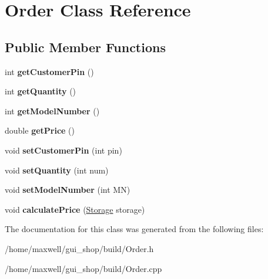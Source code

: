 \hypertarget{classOrder}{}\section{Order Class Reference}
\label{classOrder}
\subsection*{Public Member Functions}
\begin{DoxyCompactItemize}
\item 
int {\bfseries get\+Customer\+Pin} ()\hypertarget{classOrder_a580409072a98cb93cb79962d8b97ebdd}{}\label{classOrder_a580409072a98cb93cb79962d8b97ebdd}

\item 
int {\bfseries get\+Quantity} ()\hypertarget{classOrder_a458491516d3ef8338525f9be5f5f7dc8}{}\label{classOrder_a458491516d3ef8338525f9be5f5f7dc8}

\item 
int {\bfseries get\+Model\+Number} ()\hypertarget{classOrder_a8379026e646f8e9dc8efe19325bb3ee3}{}\label{classOrder_a8379026e646f8e9dc8efe19325bb3ee3}

\item 
double {\bfseries get\+Price} ()\hypertarget{classOrder_a587e5e46cc3dbe79cfc6c8a1634b845d}{}\label{classOrder_a587e5e46cc3dbe79cfc6c8a1634b845d}

\item 
void {\bfseries set\+Customer\+Pin} (int pin)\hypertarget{classOrder_ab5c20f421dc1f2a6e33093baaab606a1}{}\label{classOrder_ab5c20f421dc1f2a6e33093baaab606a1}

\item 
void {\bfseries set\+Quantity} (int num)\hypertarget{classOrder_a45a25ede1d3cb3c47240cd87b77bfe5e}{}\label{classOrder_a45a25ede1d3cb3c47240cd87b77bfe5e}

\item 
void {\bfseries set\+Model\+Number} (int MN)\hypertarget{classOrder_a539c93f3494750c62eb287e25f2562fa}{}\label{classOrder_a539c93f3494750c62eb287e25f2562fa}

\item 
void {\bfseries calculate\+Price} (\hyperlink{classStorage}{Storage} storage)\hypertarget{classOrder_af8703a4de7d66900f44aa4d7aeed9073}{}\label{classOrder_af8703a4de7d66900f44aa4d7aeed9073}

\end{DoxyCompactItemize}


The documentation for this class was generated from the following files\+:\begin{DoxyCompactItemize}
\item 
/home/maxwell/gui\+\_\+shop/build/Order.\+h\item 
/home/maxwell/gui\+\_\+shop/build/Order.\+cpp\end{DoxyCompactItemize}
